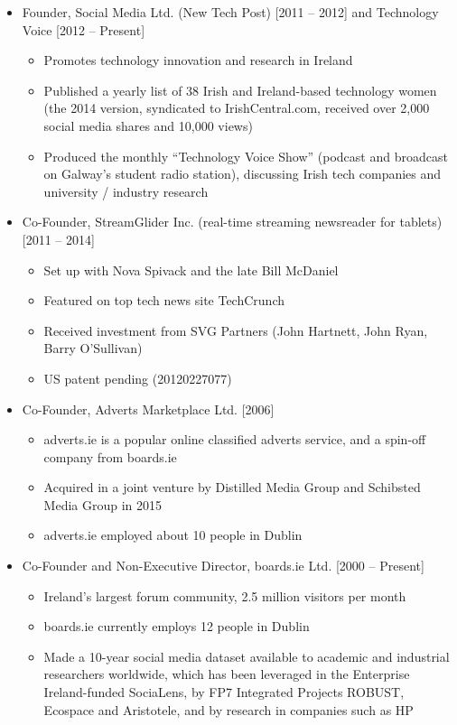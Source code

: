 \documentclass[10pt,a4paper]{res} %
\begin{document}
\begin{resume}
\begin{itemize}
\begin{itemize}
\end{itemize}
\item Founder, Social Media Ltd. (New Tech Post) [2011 -- 2012] and Technology Voice [2012 -- Present]
\begin{itemize} \itemsep -2pt
\item Promotes technology innovation and research in Ireland
\item Published a yearly list of 38 Irish and Ireland-based technology women (the 2014 version, syndicated to IrishCentral.com, received over 2,000 social media shares and 10,000 views)
\item Produced the monthly ``Technology Voice Show'' (podcast and broadcast on Galway's student radio station), discussing Irish tech companies and university / industry research
\end{itemize}
\item Co-Founder, StreamGlider Inc. (real-time streaming newsreader for tablets) [2011 -- 2014]
\begin{itemize} \itemsep -2pt
\item Set up with Nova Spivack and the late Bill McDaniel
\item Featured on top tech news site TechCrunch
\item Received investment from SVG Partners (John Hartnett, John Ryan, Barry O'Sullivan)
\item US patent pending (20120227077)
\end{itemize}
\item Co-Founder, Adverts Marketplace Ltd. [2006]
\begin{itemize} \itemsep -2pt
\item adverts.ie is a popular online classified adverts service, and a spin-off company from boards.ie
\item Acquired in a joint venture by Distilled Media Group and Schibsted Media Group in 2015
\item adverts.ie employed about 10 people in Dublin
\end{itemize}
\item Co-Founder and Non-Executive Director, boards.ie Ltd. [2000 -- Present]
\begin{itemize} \itemsep -2pt
\item Ireland's largest forum community, 2.5 million visitors per month
\item boards.ie currently employs 12 people in Dublin
\item Made a 10-year social media dataset available to academic and industrial researchers worldwide, which has been leveraged in the Enterprise Ireland-funded SociaLens, by FP7 Integrated Projects ROBUST, Ecospace and Aristotele, and by research in companies such as HP
\end{itemize}
\end{itemize}


\end{resume}
\end{document}

